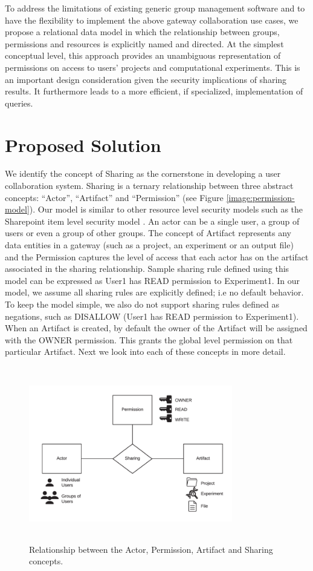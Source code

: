 \documentclass[sigconf]{acmart}
\begin{document}
To address the limitations of existing generic group management software and to have the flexibility to implement the above gateway collaboration use cases, we propose a relational data model in which the relationship between groups, permissions and resources is explicitly named and directed. At the simplest conceptual level, this approach provides an unambiguous representation of permissions on access to users’ projects and computational experiments. This is an important design consideration given the security implications of sharing results. It furthermore leads to a more efficient, if specialized, implementation of queries.


\section{Proposed Solution}
We identify the concept of Sharing as the cornerstone in developing a user collaboration system. Sharing is a ternary relationship between three abstract concepts: ``Actor'', ``Artifact'' and ``Permission'' (see Figure \ref{image:permission-model}). Our model is similar to other resource level security models such as the Sharepoint item level security model \cite{sharePointSecurity}. An actor can be a single user, a group of users or even a group of other groups. The concept of Artifact represents any data entities in a gateway (such as a project, an experiment or an output file) and the Permission captures the level of access that each actor has on the artifact associated in the sharing relationship. Sample sharing rule defined using this model can be expressed as User1 has READ permission to Experiment1. In our model, we assume all sharing rules are explicitly defined; i.e no default behavior. To keep the model simple, we also do not support sharing rules defined as negations, such as DISALLOW (User1 has READ permission to Experiment1). When an Artifact is created, by default the owner of the Artifact will be assigned with the OWNER permission. This grants the global level permission on that particular Artifact. Next we look into each of these concepts in more detail.

\begin{figure}
\includegraphics[height=3in, width=3.5in]{figures/sharing-concepts.pdf}
\caption{Relationship between the Actor, Permission, Artifact and Sharing concepts.}
\end{figure}\label{image:permission-model}
\end{document}
